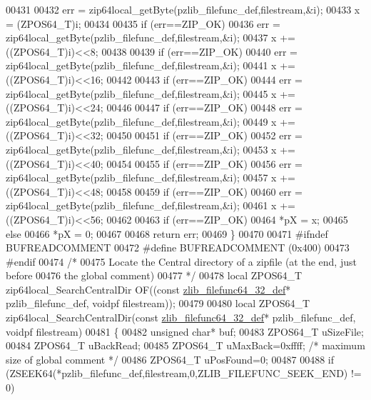 \begin{DoxyCode}
00431 
00432   err = zip64local\_getByte(pzlib\_filefunc\_def,filestream,&i);
00433   x = (ZPOS64\_T)i;
00434 
00435   \textcolor{keywordflow}{if} (err==ZIP\_OK)
00436     err = zip64local\_getByte(pzlib\_filefunc\_def,filestream,&i);
00437   x += ((ZPOS64\_T)i)<<8;
00438 
00439   \textcolor{keywordflow}{if} (err==ZIP\_OK)
00440     err = zip64local\_getByte(pzlib\_filefunc\_def,filestream,&i);
00441   x += ((ZPOS64\_T)i)<<16;
00442 
00443   \textcolor{keywordflow}{if} (err==ZIP\_OK)
00444     err = zip64local\_getByte(pzlib\_filefunc\_def,filestream,&i);
00445   x += ((ZPOS64\_T)i)<<24;
00446 
00447   \textcolor{keywordflow}{if} (err==ZIP\_OK)
00448     err = zip64local\_getByte(pzlib\_filefunc\_def,filestream,&i);
00449   x += ((ZPOS64\_T)i)<<32;
00450 
00451   \textcolor{keywordflow}{if} (err==ZIP\_OK)
00452     err = zip64local\_getByte(pzlib\_filefunc\_def,filestream,&i);
00453   x += ((ZPOS64\_T)i)<<40;
00454 
00455   \textcolor{keywordflow}{if} (err==ZIP\_OK)
00456     err = zip64local\_getByte(pzlib\_filefunc\_def,filestream,&i);
00457   x += ((ZPOS64\_T)i)<<48;
00458 
00459   \textcolor{keywordflow}{if} (err==ZIP\_OK)
00460     err = zip64local\_getByte(pzlib\_filefunc\_def,filestream,&i);
00461   x += ((ZPOS64\_T)i)<<56;
00462 
00463   \textcolor{keywordflow}{if} (err==ZIP\_OK)
00464     *pX = x;
00465   \textcolor{keywordflow}{else}
00466     *pX = 0;
00467 
00468   \textcolor{keywordflow}{return} err;
00469 \}
00470 
00471 \textcolor{preprocessor}{#ifndef BUFREADCOMMENT}
00472 \textcolor{preprocessor}{#define BUFREADCOMMENT (0x400)}
00473 \textcolor{preprocessor}{#endif}
00474 \textcolor{comment}{/*}
00475 \textcolor{comment}{  Locate the Central directory of a zipfile (at the end, just before}
00476 \textcolor{comment}{    the global comment)}
00477 \textcolor{comment}{*/}
00478 local ZPOS64\_T zip64local\_SearchCentralDir OF((\textcolor{keyword}{const} \hyperlink{structzlib__filefunc64__32__def__s}{zlib\_filefunc64\_32\_def}* 
      pzlib\_filefunc\_def, voidpf filestream));
00479 
00480 local ZPOS64\_T zip64local\_SearchCentralDir(\textcolor{keyword}{const} \hyperlink{structzlib__filefunc64__32__def__s}{zlib\_filefunc64\_32\_def}* 
      pzlib\_filefunc\_def, voidpf filestream)
00481 \{
00482   \textcolor{keywordtype}{unsigned} \textcolor{keywordtype}{char}* buf;
00483   ZPOS64\_T uSizeFile;
00484   ZPOS64\_T uBackRead;
00485   ZPOS64\_T uMaxBack=0xffff; \textcolor{comment}{/* maximum size of global comment */}
00486   ZPOS64\_T uPosFound=0;
00487 
00488   \textcolor{keywordflow}{if} (ZSEEK64(*pzlib\_filefunc\_def,filestream,0,ZLIB\_FILEFUNC\_SEEK\_END) != 0)

\end{DoxyCode}
